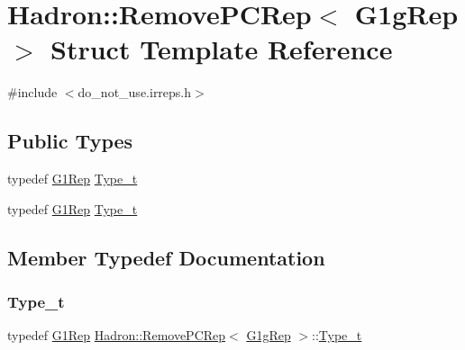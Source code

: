 \hypertarget{structHadron_1_1RemovePCRep_3_01G1gRep_01_4}{}\section{Hadron\+:\+:Remove\+P\+C\+Rep$<$ G1g\+Rep $>$ Struct Template Reference}
\label{structHadron_1_1RemovePCRep_3_01G1gRep_01_4}


{\ttfamily \#include $<$do\+\_\+not\+\_\+use.\+irreps.\+h$>$}

\subsection*{Public Types}
\begin{DoxyCompactItemize}
\item 
typedef \mbox{\hyperlink{structHadron_1_1G1Rep}{G1\+Rep}} \mbox{\hyperlink{structHadron_1_1RemovePCRep_3_01G1gRep_01_4_abf2b92413572b161f78c06e6bfd31f11}{Type\+\_\+t}}
\item 
typedef \mbox{\hyperlink{structHadron_1_1G1Rep}{G1\+Rep}} \mbox{\hyperlink{structHadron_1_1RemovePCRep_3_01G1gRep_01_4_abf2b92413572b161f78c06e6bfd31f11}{Type\+\_\+t}}
\end{DoxyCompactItemize}


\subsection{Member Typedef Documentation}
\mbox{\label{structHadron_1_1RemovePCRep_3_01G1gRep_01_4_abf2b92413572b161f78c06e6bfd31f11}} 
\subsubsection{\texorpdfstring{Type\_t}{Type\_t}\hspace{0.1cm}{\footnotesize\ttfamily [1/2]}}
{\footnotesize\ttfamily typedef \mbox{\hyperlink{structHadron_1_1G1Rep}{G1\+Rep}} \mbox{\hyperlink{structHadron_1_1RemovePCRep}{Hadron\+::\+Remove\+P\+C\+Rep}}$<$ \mbox{\hyperlink{structHadron_1_1G1gRep}{G1g\+Rep}} $>$\+::\mbox{\hyperlink{structHadron_1_1RemovePCRep_3_01G1gRep_01_4_abf2b92413572b161f78c06e6bfd31f11}{Type\+\_\+t}}}

